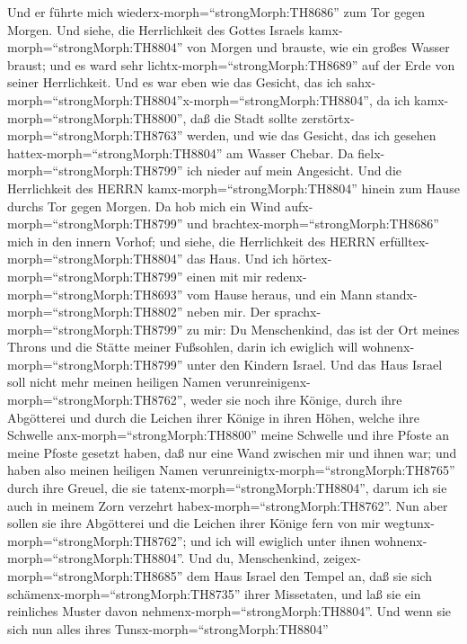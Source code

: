  Und er führte mich wiederx-morph=``strongMorph:TH8686'' zum
Tor gegen Morgen.  Und siehe, die Herrlichkeit des Gottes
Israels kamx-morph=``strongMorph:TH8804'' von Morgen und brauste, wie
ein großes Wasser braust; und es ward sehr
lichtx-morph=``strongMorph:TH8689'' auf der Erde von seiner
Herrlichkeit.  Und es war eben wie das Gesicht, das ich
sahx-morph=``strongMorph:TH8804''x-morph=``strongMorph:TH8804'', da ich
kamx-morph=``strongMorph:TH8800'', daß die Stadt sollte
zerstörtx-morph=``strongMorph:TH8763'' werden, und wie das Gesicht, das
ich gesehen hattex-morph=``strongMorph:TH8804'' am Wasser Chebar. Da
fielx-morph=``strongMorph:TH8799'' ich nieder auf mein Angesicht.
 Und die Herrlichkeit des HERRN
kamx-morph=``strongMorph:TH8804'' hinein zum Hause durchs Tor gegen
Morgen.  Da hob mich ein Wind
aufx-morph=``strongMorph:TH8799'' und
brachtex-morph=``strongMorph:TH8686'' mich in den innern Vorhof; und
siehe, die Herrlichkeit des HERRN erfülltex-morph=``strongMorph:TH8804''
das Haus.  Und ich hörtex-morph=``strongMorph:TH8799'' einen
mit mir redenx-morph=``strongMorph:TH8693'' vom Hause heraus, und ein
Mann standx-morph=``strongMorph:TH8802'' neben mir.  Der
sprachx-morph=``strongMorph:TH8799'' zu mir: Du Menschenkind, das ist
der Ort meines Throns und die Stätte meiner Fußsohlen, darin ich
ewiglich will wohnenx-morph=``strongMorph:TH8799'' unter den Kindern
Israel. Und das Haus Israel soll nicht mehr meinen heiligen Namen
verunreinigenx-morph=``strongMorph:TH8762'', weder sie noch ihre Könige,
durch ihre Abgötterei und durch die Leichen ihrer Könige in ihren Höhen,
 welche ihre Schwelle anx-morph=``strongMorph:TH8800'' meine
Schwelle und ihre Pfoste an meine Pfoste gesetzt haben, daß nur eine
Wand zwischen mir und ihnen war; und haben also meinen heiligen Namen
verunreinigtx-morph=``strongMorph:TH8765'' durch ihre Greuel, die sie
tatenx-morph=``strongMorph:TH8804'', darum ich sie auch in meinem Zorn
verzehrt habex-morph=``strongMorph:TH8762''.  Nun aber
sollen sie ihre Abgötterei und die Leichen ihrer Könige fern von mir
wegtunx-morph=``strongMorph:TH8762''; und ich will ewiglich unter ihnen
wohnenx-morph=``strongMorph:TH8804''.  Und du,
Menschenkind, zeigex-morph=``strongMorph:TH8685'' dem Haus Israel den
Tempel an, daß sie sich schämenx-morph=``strongMorph:TH8735'' ihrer
Missetaten, und laß sie ein reinliches Muster davon
nehmenx-morph=``strongMorph:TH8804''.  Und wenn sie sich
nun alles ihres Tunsx-morph=``strongMorph:TH8804''
